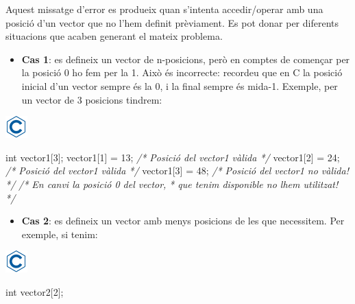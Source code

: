 \documentclass[]{book}
\newenvironment{Shaded}{\begin{snugshade}}{\end{snugshade}}
\newcommand{\CommentTok}[1]{\textcolor[rgb]{0.56,0.35,0.01}{\textit{#1}}}
\newcommand{\DataTypeTok}[1]{\textcolor[rgb]{0.13,0.29,0.53}{#1}}
\newcommand{\DecValTok}[1]{\textcolor[rgb]{0.00,0.00,0.81}{#1}}
\newcommand{\NormalTok}[1]{#1}
\providecommand{\tightlist}{%
  \setlength{\itemsep}{0pt}\setlength{\parskip}{0pt}}
\begin{document}
Aquest missatge d'error es produeix quan s'intenta accedir/operar amb una posició d'un vector que no l'hem definit prèviament. Es pot donar per diferents situacions que acaben generant el mateix problema.

\begin{itemize}
\tightlist
\item
  \textbf{Cas 1}: es defineix un vector de n-posicions, però en comptes de començar per la posició 0 ho fem per la 1. Això és incorrecte: recordeu que en C la posició inicial d'un vector sempre és la 0, i la final sempre és mida-1. Exemple, per un vector de 3 posicions tindrem:
\end{itemize}

\includegraphics{./img/c.png}

\begin{Shaded}
\begin{Highlighting}[]
\DataTypeTok{int}\NormalTok{ vector1[}\DecValTok{3}\NormalTok{];}
\NormalTok{vector1[}\DecValTok{1}\NormalTok{] = }\DecValTok{13}\NormalTok{;  }\CommentTok{/* Posició del vector1 vàlida */}
\NormalTok{vector1[}\DecValTok{2}\NormalTok{] = }\DecValTok{24}\NormalTok{;  }\CommentTok{/* Posició del vector1 vàlida */}
\NormalTok{vector1[}\DecValTok{3}\NormalTok{] = }\DecValTok{48}\NormalTok{;  }\CommentTok{/* Posició del vector1 no vàlida! */}
\CommentTok{/* En canvi la posició 0 del vector, }
\CommentTok{ * que tenim disponible no l\textquotesingle{}hem utilitzat! }
\CommentTok{ */}
\end{Highlighting}
\end{Shaded}

\begin{itemize}
\tightlist
\item
  \textbf{Cas 2}: es defineix un vector amb menys posicions de les que necessitem. Per exemple, si tenim:
\end{itemize}

\includegraphics{./img/c.png}

\begin{Shaded}
\begin{Highlighting}[]
\DataTypeTok{int}\NormalTok{ vector2[}\DecValTok{2}\NormalTok{];}
\end{Highlighting}
\end{Shaded}
\end{document}
